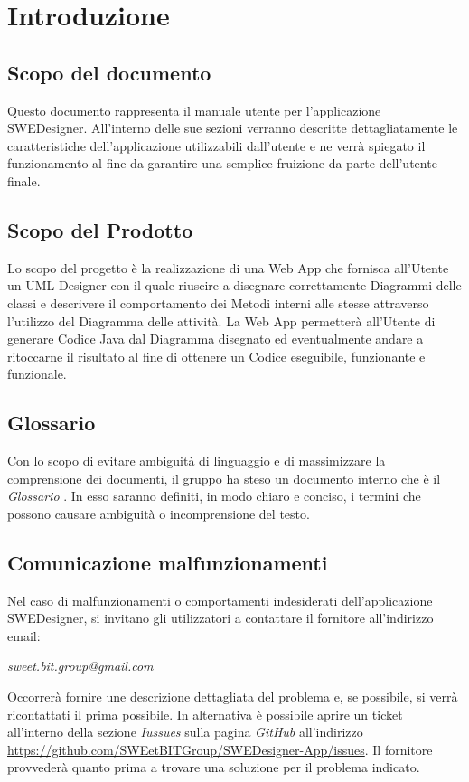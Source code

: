 \section{Introduzione}
  \subsection{Scopo del documento}
          Questo documento rappresenta il manuale utente per l'applicazione SWEDesigner.
          All'interno delle sue sezioni verranno descritte dettagliatamente le caratteristiche dell'applicazione utilizzabili dall'utente e ne verrà spiegato il funzionamento
          al fine da garantire una semplice fruizione da parte dell'utente finale.
  \subsection{Scopo del Prodotto}
          Lo scopo del progetto è la realizzazione di una Web App che fornisca all'Utente un UML Designer con il quale riuscire a disegnare correttamente Diagrammi delle classi
          e descrivere il comportamento dei Metodi interni alle stesse attraverso l'utilizzo del Diagramma delle attività.
          La Web App permetterà all'Utente di generare Codice Java dal Diagramma disegnato ed eventualmente andare a ritoccarne il risultato al fine di ottenere un Codice
          eseguibile, funzionante e funzionale.
  \subsection{Glossario}
          Con lo scopo di evitare ambiguità di linguaggio e di massimizzare la comprensione dei documenti, il gruppo ha steso un documento interno che è il \emph{Glossario \VersioneG{}}. In esso saranno definiti, in modo chiaro e conciso, i termini che possono causare ambiguità o incomprensione del testo.
  \subsection{Comunicazione malfunzionamenti}
  Nel caso di malfunzionamenti o comportamenti indesiderati dell'applicazione SWEDesigner, si invitano gli utilizzatori a contattare il fornitore all'indirizzo email:\\
  \begin{center}
  \emph{sweet.bit.group@gmail.com}
  \end{center}
Occorrerà fornire une descrizione dettagliata del problema e, se possibile, si verrà ricontattati il prima possibile.
In alternativa è possibile aprire un ticket all'interno della sezione \emph{Iussues} sulla pagina \emph{GitHub} all'indirizzo \url{https://github.com/SWEetBITGroup/SWEDesigner-App/issues}. Il fornitore provvederà quanto prima
a trovare una soluzione per il problema indicato.
